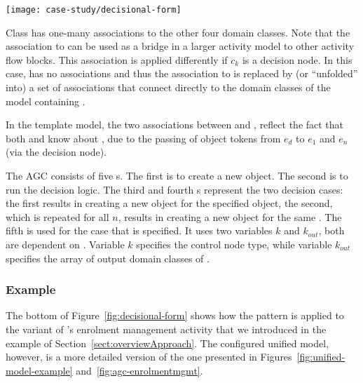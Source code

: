 \begin{figure*}[ht]
\begin{center}
\texttt{[image: case-study/decisional-form]}
\end{center}
\caption{The decisional pattern form.} %
\label{fig:decisional-form}
\end{figure*}

Class  has one-many associations to the other four domain classes. 
Note that the association to  can be used as a bridge in a larger activity model to other activity flow blocks. This association is applied differently if $ c_k $ is a decision node. In this case,  has no associations and thus the association to  is replaced by (or ``unfolded'' into) a set of associations that connect  directly to the domain classes of the model containing .

In the template model, the two associations between  and ,  reflect the fact that both  and  know about , due to the passing of object tokens from $ e_d $ to $ e_1 $ and $ e_n $ (via the decision node).

The AGC consists of five s. The first  is to create a new  object. The second  is to run the decision logic. The third and fourth s represent the two decision cases: the first results in creating a new  object for the specified  object, the second, which is repeated for all $ n $, results in creating a new  object for the same . The fifth  is used for the case that  is specified. It uses two variables $ k $ and $ k_{out} $, both are dependent on . Variable $ k $ specifies the control node type, while variable $ k_{out} $ specifies the array of output domain classes of .

\subsubsection*{Example}
The bottom of Figure~\ref{fig:decisional-form} shows how the pattern is applied to the variant of \courseman's enrolment management activity that we introduced in the example of Section~\ref{sect:overviewApproach}. The configured unified model, however, is a more detailed version of the one presented in Figures~\ref{fig:unified-model-example} and~\ref{fig:agc-enrolmentmgmt}. 

